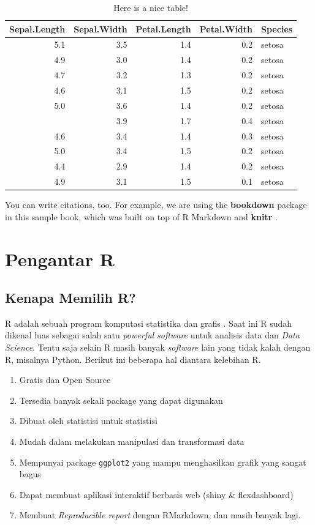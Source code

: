 \documentclass[]{book}
\providecommand{\tightlist}{%
  \setlength{\itemsep}{0pt}\setlength{\parskip}{0pt}}
\begin{document}
\begin{table}[t]

\caption{\label{tab:nice-tab}Here is a nice table!}
\centering
\begin{tabular}{rrrrl}
\toprule
Sepal.Length & Sepal.Width & Petal.Length & Petal.Width & Species\\
\midrule
5.1 & 3.5 & 1.4 & 0.2 & setosa\\
4.9 & 3.0 & 1.4 & 0.2 & setosa\\
4.7 & 3.2 & 1.3 & 0.2 & setosa\\
4.6 & 3.1 & 1.5 & 0.2 & setosa\\
5.0 & 3.6 & 1.4 & 0.2 & setosa\\
\addlinespace
5.4 & 3.9 & 1.7 & 0.4 & setosa\\
4.6 & 3.4 & 1.4 & 0.3 & setosa\\
5.0 & 3.4 & 1.5 & 0.2 & setosa\\
4.4 & 2.9 & 1.4 & 0.2 & setosa\\
4.9 & 3.1 & 1.5 & 0.1 & setosa\\
\bottomrule
\end{tabular}
\end{table}

You can write citations, too. For example, we are using the \textbf{bookdown} package \citep{xie2019} in this sample book, which was built on top of R Markdown and \textbf{knitr} \citep{xie2015}. \citep{hadley}

\hypertarget{intro}{%
\chapter{Pengantar R}\label{intro}}

\hypertarget{kenapa-memilih-r}{%
\section{Kenapa Memilih R?}\label{kenapa-memilih-r}}

R adalah sebuah program komputasi statistika dan grafis \citep{R-base}. Saat ini R sudah dikenal luas sebagai salah satu \emph{powerful software} untuk analisis data dan \emph{Data Science}. Tentu saja selain R masih banyak \emph{software} lain yang tidak kalah dengan R, misalnya Python. Berikut ini beberapa hal diantara kelebihan R.

\begin{enumerate}
\def\labelenumi{\arabic{enumi}.}
\tightlist
\item
  Gratis dan Open Source
\item
  Tersedia banyak sekali package yang dapat digunakan
\item
  Dibuat oleh statistisi untuk statistisi
\item
  Mudah dalam melakukan manipulasi dan transformasi data
\item
  Mempunyai package \texttt{ggplot2} yang mampu menghasilkan grafik yang sangat bagus
\item
  Dapat membuat aplikasi interaktif berbasis web (shiny \& flexdashboard)
\item
  Membuat \emph{Reproducible report} dengan RMarkdown, dan masih banyak lagi.
\end{enumerate}
\end{document}
